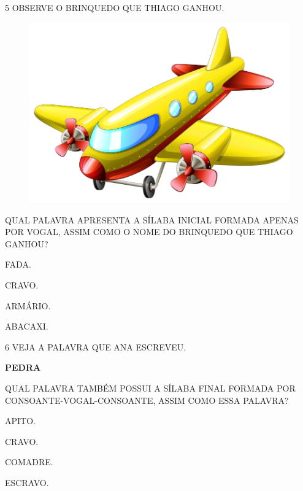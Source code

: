 \num{5} OBSERVE O BRINQUEDO QUE THIAGO GANHOU.

\begin{figure}[H]
\centering
\includegraphics[width=.7\textwidth]{./media/image239.png}
\end{figure}

QUAL PALAVRA APRESENTA A SÍLABA INICIAL FORMADA APENAS POR VOGAL, ASSIM COMO O NOME DO BRINQUEDO QUE THIAGO GANHOU?

\begin{escolha}

\item FADA.

\item CRAVO.

\item ARMÁRIO.

\item ABACAXI.

\end{escolha}

\pagebreak
\num{6} VEJA A PALAVRA QUE ANA ESCREVEU.

\begin{myquote}
\begin{center}
\textbf{PEDRA}
\end{center}
\end{myquote}

QUAL PALAVRA TAMBÉM POSSUI A SÍLABA FINAL FORMADA POR CONSOANTE-VOGAL-CONSOANTE, ASSIM COMO ESSA PALAVRA?

\begin{escolha}

\item APITO.

\item CRAVO.

\item COMADRE. 

\item ESCRAVO.

\end{escolha}

